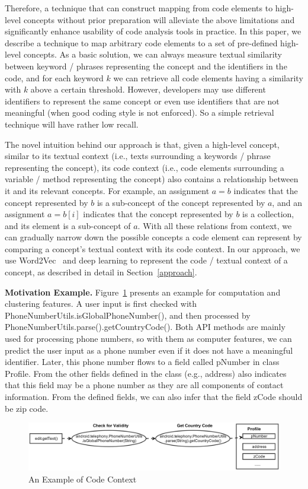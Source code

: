 Therefore, a technique that can construct mapping from code elements to high-level concepts without prior preparation will alleviate the above limitations and significantly enhance usability of code analysis tools in practice. In this paper, we describe a technique to map arbitrary code elements to a set of pre-defined high-level concepts. As a basic solution, we can always measure textual similarity between keyword / phrases representing the concept and the identifiers in the code, and for each keyword $k$ we can retrieve all code elements having a similarity with $k$ above a certain threshold. However, developers may use different identifiers to represent the same concept or even use identifiers that are not meaningful (when good coding style is not enforced). So a simple retrieval technique will have rather low recall. 

The novel intuition behind our approach is that, given a high-level concept, similar to its textual context (i.e., texts surrounding a keywords / phrase representing the concept), its code context (i.e., code elements surrounding a variable / method representing the concept) also contains a relationship between it and its relevant concepts. For example, an assignment $a = b$ indicates that the concept represented by $b$ is a sub-concept of the concept represented by $a$, and an assignment $a = b[i]$ indicates that the concept represented by $b$ is a collection, and its element is a sub-concept of $a$. With all these relations from context, we can gradually narrow down the possible concepts a code element can represent by comparing a concept's textual context with its code context. In our approach, we use Word2Vec~\cite{mikolov2013efficient} and deep learning to represent the code / textual context of a concept, as described in detail in Section~\ref{approach}.


\textbf{Motivation Example.} Figure~\ref{example} presents an example for computation and clustering features. A user input is first checked with PhoneNumberUtils.isGlobalPhoneNumber(), and then processed by PhoneNumberUtils.parse().getCountryCode(). Both API methods are mainly used for processing phone numbers, so with them as computer features, we can predict the user input as a phone number even if it does not have a meaningful identifier. Later, this phone number flows to a field called pNumber in class Profile. From the other fields defined in the class (e.g., address) also indicates that this field may be a phone number as they are all components of contact information. From the defined fields, we can also infer that the field zCode should be zip code.

\begin{figure}
	\centering
	\includegraphics[width=\textwidth]{figures/example_computationOld.png}
	\caption{An Example of Code Context}
	\label{example}
\end{figure}